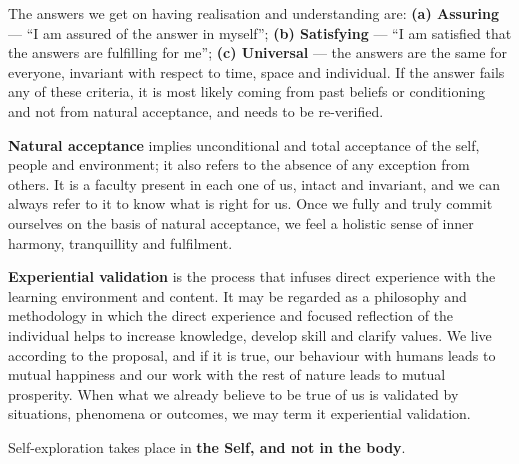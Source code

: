 The answers we get on having realisation and understanding are:
\textbf{(a) Assuring} --- ``I am assured of the answer in myself'';
\textbf{(b) Satisfying} --- ``I am satisfied that the answers are fulfilling
for me''; \textbf{(c) Universal} --- the answers are the same for everyone,
invariant with respect to time, space and individual. If the answer fails any
of these criteria, it is most likely coming from past beliefs or conditioning
and not from natural acceptance, and needs to be re-verified.


\ans \textbf{Natural acceptance} implies unconditional and total acceptance of
the self, people and environment; it also refers to the absence of any
exception from others. It is a faculty present in each one of us, intact and
invariant, and we can always refer to it to know what is right for us. Once we
fully and truly commit ourselves on the basis of natural acceptance, we feel a
holistic sense of inner harmony, tranquillity and fulfilment.

\textbf{Experiential validation} is the process that infuses direct experience
with the learning environment and content. It may be regarded as a philosophy
and methodology in which the direct experience and focused reflection of the
individual helps to increase knowledge, develop skill and clarify values. We
live according to the proposal, and if it is true, our behaviour with humans
leads to mutual happiness and our work with the rest of nature leads to mutual
prosperity. When what we already believe to be true of us is validated by
situations, phenomena or outcomes, we may term it experiential validation.

Self-exploration takes place in \textbf{the Self, and not in the body}.


